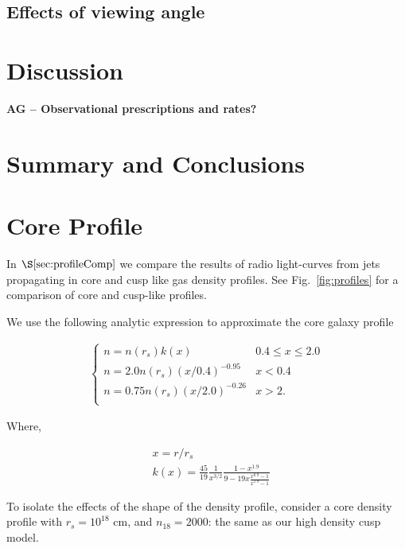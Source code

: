 \documentclass[usenatbib,fleqn]{mnras}
\begin{document}
\subsection{Effects of viewing angle}


\section{Discussion}
\label{sec:disc}
{\bf AG -- Observational prescriptions and rates?}

\section{Summary and Conclusions}
\label{sec:conc}

\appendix
\section{Core Profile}
In $\S\ref{sec:profileComp}$ we compare the results of radio
light-curves from jets propagating in core and cusp like gas density
profiles. See Fig.~\ref{fig:profiles} for a comparison of core and
cusp-like profiles. 

We use the following analytic expression to approximate the core
galaxy profile

\begin{align}
\begin{cases}
n=n(r_s) k(x) & 0.4 \leq x\leq 2.0\\
n = 2.0 n(r_s) (x/0.4)^{-0.95} & x < 0.4\\
n = 0.75 n(r_s) (x/2.0)^{-0.26} & x>2.\\
\end{cases}
\label{eq:cores}
\end{align}

Where, 

\begin{align}
  &x=r/r_s\\\nonumber
  &k(x)=\frac{45}{19} \frac{1}{x^{3/2}} \frac{1-x^{1.9}}{9-19
      x\frac{x^{0.9}-1}{x^{1.9}-1}}
\end{align}

To isolate the effects of the shape of the density profile, consider a
core density profile with $r_s=10^{18}$ cm, and $n_{18}=2000$: the
same as our high density cusp model.

\clearpage
  \footnotesize{
    
    
  }
\end{document}
